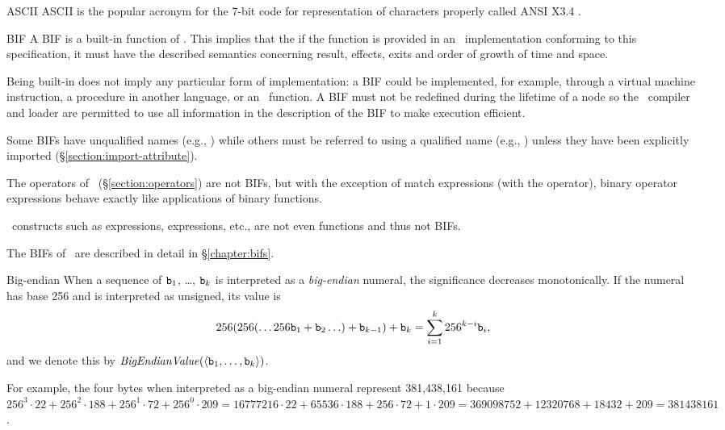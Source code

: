 \begin{Lentry}
\item[ASCII]
ASCII is the popular acronym for the 7-bit code for representation of
characters properly called ANSI X3.4 \cite{ascii}.

\item[BIF]
A BIF is a built-in function of \Erlang.
\ifStd
This implies that the if the function is provided in an \Erlang\
implementation conforming to this specification, it must have the
described semantics concerning result, effects, exits and order of
growth of time and space.
\fi

Being built-in does not imply any particular form of implementation: a
BIF could be implemented, for example, through a virtual machine
instruction, a procedure in another language, or an \Erlang\ function.
A BIF must not be redefined during the lifetime of a node so the
\Erlang\ compiler and loader are permitted to use all information in
the description of the BIF to make execution efficient.

Some BIFs have unqualified names (e.g., ) while others
must be referred to using a qualified name (e.g., \T{lists:map/2})
unless they have been explicitly imported
(\S\ref{section:import-attribute}).

The operators of \Erlang\ (\S\ref{section:operators}) are not BIFs,
but with the exception of match expressions\index{match expression}
(with the \T{=} operator), binary operator expressions behave exactly
like applications of binary functions.

\Erlang\ constructs such as  expressions,  expressions, etc.,
are not even functions and thus not BIFs.

The BIFs of \Erlang\ are described in detail in \S\ref{chapter:bifs}.
\index{BIF|)}

\item[Big-endian]
\label{page:big-endian}
When a sequence of  ${\tt{\sl b}}_1$, \ldots, ${\tt{\sl b}}_k$ is interpreted as a
\emph{big-endian} numeral, the significance decreases monotonically.
If the numeral has base 256 and is interpreted as unsigned, its value is
\[256(256(\ldots 256{\tt{\sl b}}_1+{\tt{\sl b}}_2\ldots)+{\tt{\sl b}}_{k-1})+{\tt{\sl b}}_k = \sum_{i=1}^k 256^{k-i}{\tt{\sl b}}_i,\]
and we denote this by
${\it BigEndianValue}(\langle{\tt{\sl b}}_1, \ldots, {\tt{\sl b}}_k\rangle)$.

For example, the four bytes
 when interpreted as a big-endian numeral represent
381,438,161 because $256^3\cdot22+256^2\cdot188+256^1\cdot72+256^0\cdot209 =
16777216\cdot22+65536\cdot188+256\cdot72+1\cdot209 = 369098752+12320768+18432+209 =
381438161$.


\end{Lentry}
